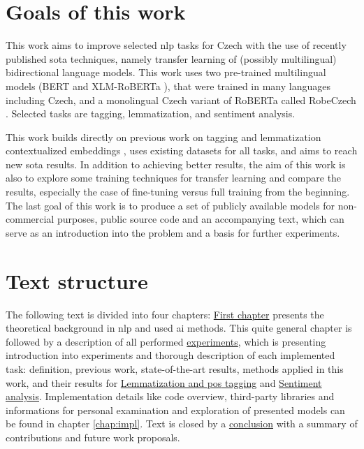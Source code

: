 \section*{Goals of this work}
This work aims to improve selected \acrfull{nlp} tasks for Czech with the use of recently published \acrfull{sota} techniques, namely transfer learning of (possibly multilingual) bidirectional language models. This work uses two pre-trained multilingual models (BERT \citep{Devlin2019} and XLM-RoBERTa \citep{Conneau2019}), that were trained in many languages including Czech, and a monolingual Czech variant of RoBERTa called RobeCzech \citep{Straka2021}. Selected tasks are tagging, lemmatization, and sentiment analysis.\par This work builds directly on previous work on tagging and lemmatization contextualized embeddings \citep{straka2019czech}, uses existing datasets for all tasks, and aims to reach new \acrfull{sota} results. In addition to achieving better results, the aim of this work is also to explore some training techniques for transfer learning and compare the results, especially the case of fine-tuning versus full training from the beginning.  The last goal of this work is to produce a set of publicly available models for non-commercial purposes, public source code and an accompanying text, which can serve as an introduction into the problem and a basis for further experiments.
\section*{Text structure}
The following text is divided into four chapters: \hyperref[chap:theandme]{First chapter} presents the theoretical background in \acrshort{nlp} and used \acrfull{ai} methods. This quite general chapter is followed by a description of all performed \hyperref[chap:exp]{experiments}, which is presenting introduction into experiments and thorough description of each implemented task: definition, previous work, state-of-the-art results, methods applied in this work, and their results for \hyperref[chap:tag]{Lemmatization and \acrlong{pos} tagging} and  \hyperref[chap:sent]{Sentiment analysis}. Implementation details like code overview, third-party libraries and informations for personal examination and exploration of presented models can be found in chapter \ref{chap:impl}. Text is closed by a \hyperref[chap:concl]{conclusion} with a summary of contributions and future work proposals.


